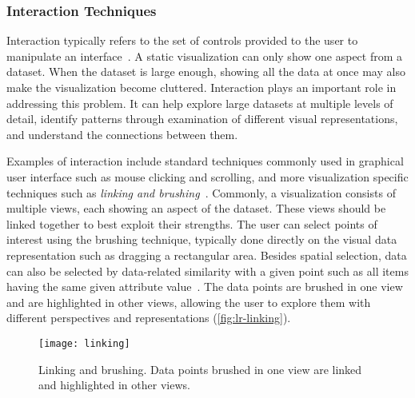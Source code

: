 
\subsubsection{Interaction Techniques}
Interaction typically refers to the set of controls provided to the user to manipulate an interface~\cite{Pike2009a}. A static visualization can only show one aspect from a dataset. When the dataset is large enough, showing all the data at once may also make the visualization become cluttered. Interaction plays an important role in addressing this problem. It can help explore large datasets at multiple levels of detail, identify patterns through examination of different visual representations, and understand the connections between them.

Examples of interaction include standard techniques commonly used in graphical user interface such as mouse clicking and scrolling, and more visualization specific techniques such as \emph{linking and brushing}~\cite{Kosara2003}. Commonly, a visualization consists of multiple views, each showing an aspect of the dataset. These views should be linked together to best exploit their strengths. The user can select points of interest using the brushing technique, typically done directly on the visual data representation such as dragging a rectangular area. Besides spatial selection, data can also be selected by data-related similarity with a given point such as all items having the same given attribute value~\cite{Heer2008a}. The data points are brushed in one view and are highlighted in other views, allowing the user to explore them with different perspectives and representations (\autoref{fig:lr-linking}). 

\begin{figure}[!htb]
	\centering
	\texttt{[image: linking]}
	\caption{Linking and brushing. Data points brushed in one view are linked and highlighted in other views.}
	\label{fig:lr-linking}
\end{figure}

